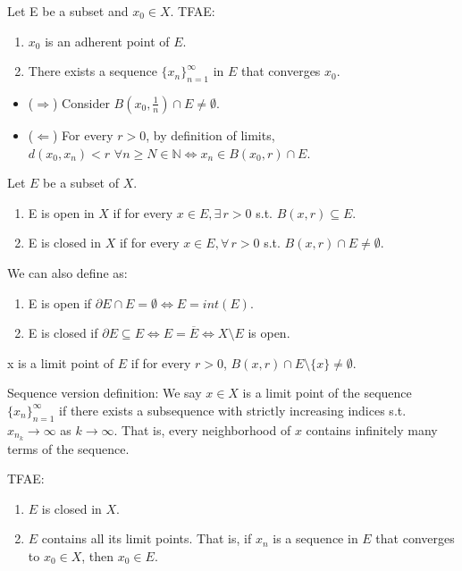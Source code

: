 \documentclass[12pt]{article}
\begin{document}
\begin{theorem}
    Let E be a subset and $x_0\in X$. TFAE:
    \begin{enumerate}
        \item $x_0$ is an adherent point of $E$.
        \item There exists a sequence $\{x_n\}^\infty_{n=1}$ in $E$ that converges $x_0$.
    \end{enumerate}
\end{theorem}
\begin{pfbox}
\begin{itemize}
\item ($\Rightarrow$) Consider $B(x_0,\frac{1}{n})\cap E \neq \emptyset$.
\item ($\Leftarrow$) For every $r>0$, by definition of limits, $d(x_0,x_n)<r \,\, \forall n\geq N\in \mathbb{N} \Leftrightarrow x_n \in B(x_0,r)\cap E$.
\end{itemize}
\end{pfbox}


\begin{definition}
    Let $E$ be a subset of $X$.
\begin{enumerate}
        \item E is open in $X$ if for every $x \in E, \exists\,r > 0$ s.t. $B(x,r) \subseteq E$.
        \item E is closed in $X$ if for every $x \in E, \forall\,r > 0$ s.t. $B(x,r) \cap E \neq \emptyset$.
\end{enumerate}
We can also define as:
\begin{enumerate}
    \item E is open if $\partial E \cap E =\emptyset \Leftrightarrow E = int(E) $.
    \item E is closed if $\partial E \subseteq E \Leftrightarrow E = \overline{E} \Leftrightarrow X\setminus E$ is open.
\end{enumerate}
\end{definition}

\begin{bbox}
\begin{definition}
x is a limit point of $E$ if for every $r > 0$, $B(x,r)\cap E\setminus \{x\} \neq \emptyset$.

Sequence version definition: We say $x\in X$ is a limit point of the sequence $\{x_n\}^\infty_{n=1}$
if there exists a subsequence with strictly increasing indices s.t. $x_{n_k}\rightarrow\infty$ as $k\rightarrow\infty$.
That is, every neighborhood of $x$ contains infinitely many terms of the sequence.
\end{definition}

\begin{theorem}
    TFAE:
    \begin{enumerate}
        \item $E$ is closed in $X$.
        \item $E$ contains all its limit points. That is, if $x_n$ is a sequence in $E$ that converges to $x_0 \in X$, then $x_0 \in E$. 
    \end{enumerate}
\end{theorem}
\end{bbox}
\end{document}

